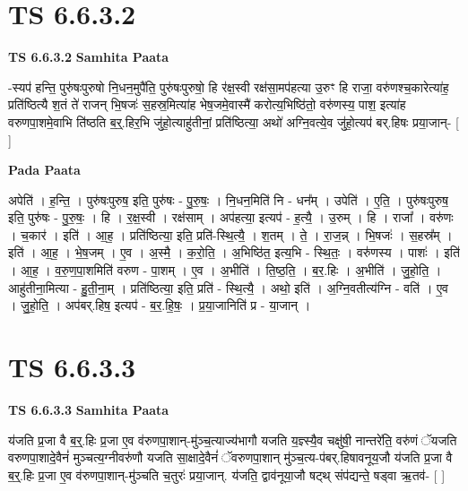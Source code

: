 \documentclass[17pt]{extarticle}
\begin{document}
\section*{ TS 6.6.3.2 }

\textbf{TS 6.6.3.2 } \newline
\textbf{Samhita Paata} \newline

-स्यप॑ हन्ति॒ पुरु॑षःपुरुषो नि॒धन॒मुपै॑ति॒ पुरु॑षःपुरुषो॒ हि र॑क्ष॒स्वी रक्ष॑सा॒मप॑हत्या उ॒रुꣳ हि राजा॒ वरु॑णश्च॒कारेत्या॑ह॒ प्रति॑ष्ठित्यै श॒तं ते॑ राजन् भि॒षजः॑ स॒हस्र॒मित्या॑ह भेष॒जमे॒वास्मै॑ करोत्य॒भिष्ठि॑तो॒ वरु॑णस्य॒ पाश॒ इत्या॑ह वरुणपा॒शमे॒वाभि ति॑ष्ठति ब॒र्॒.हिर॒भि जु॑हो॒त्याहु॑तीनां॒ प्रति॑ष्ठित्या॒ अथो॑ अग्नि॒वत्ये॒व जु॑हो॒त्यप॑ बर्.हिषः प्रया॒जान्- [  ] \newline

\textbf{Pada Paata} \newline

अपेति॑ । ह॒न्ति॒ । पुरु॑षःपुरुष॒ इति॒ पुरु॑षः - पु॒रु॒षः॒ । नि॒धन॒मिति॑ नि - धन᳚म् । उपेति॑ । ए॒ति॒ । पुरु॑षःपुरुष॒ इति॒ पुरु॑षः - पु॒रु॒षः॒ । हि । र॒क्ष॒स्वी । रक्ष॑साम् । अप॑हत्या॒ इत्यप॑ - ह॒त्यै॒ । उ॒रुम् । हि । राजा᳚ । वरु॑णः । च॒कार॑ । इति॑ । आ॒ह॒ । प्रति॑ष्ठित्या॒ इति॒ प्रति॑-स्थि॒त्यै॒ । श॒तम् । ते॒ । रा॒ज॒न्न् । भि॒षजः॑ । स॒हस्र᳚म् । इति॑ । आ॒ह॒ । भे॒ष॒जम् । ए॒व । अ॒स्मै॒ । क॒रो॒ति॒ । अ॒भिष्ठि॑त॒ इत्य॒भि - स्थि॒तः॒ । वरु॑णस्य । पाशः॑ । इति॑ । आ॒ह॒ । व॒रु॒ण॒पा॒शमिति॑ वरुण - पा॒शम् । ए॒व । अ॒भीति॑ । ति॒ष्ठ॒ति॒ । ब॒र॒.हिः । अ॒भीति॑ । जु॒हो॒ति॒ । आहु॑तीना॒मित्या - हु॒ती॒ना॒म् । प्रति॑ष्ठित्या॒ इति॒ प्रति॑ - स्थि॒त्यै॒ । अथो॒ इति॑ । अ॒ग्नि॒वतीत्य॑ग्नि - वति॑ । ए॒व । जु॒हो॒ति॒ । अप॑बर्.हिष॒ इत्यप॑ - ब॒र॒.हि॒षः॒ । प्र॒या॒जानिति॑ प्र - या॒जान् ।  \newline




\section*{ TS 6.6.3.3 }

\textbf{TS 6.6.3.3 } \newline
\textbf{Samhita Paata} \newline

य॑जति प्र॒जा वै ब॒र्॒.हिः प्र॒जा ए॒व व॑रुणपा॒शान्-मु॑ञ्च॒त्याज्य॑भागौ यजति य॒ज्ञ्स्यै॒व चक्षु॑षी॒ नान्तरे॑ति॒ वरु॑णं ॅयजति वरुणपा॒शादे॒वैनं॑ मुञ्चत्य॒ग्नीवरु॑णौ यजति सा॒क्षादे॒वैनं॑ ॅवरुणपा॒शान् मु॑ञ्च॒त्य-प॑बर्.हिषावनूय॒जौ य॑जति प्र॒जा वै ब॒र्॒.हिः प्र॒जा ए॒व व॑रुणपा॒शान्-मु॑ञ्चति च॒तुरः॑ प्रया॒जान्. य॑जति॒ द्वाव॑नूया॒जौ षट्थ् संप॑द्यन्ते॒ षड्वा ऋ॒तव॑- [  ] \newline
\end{document}
